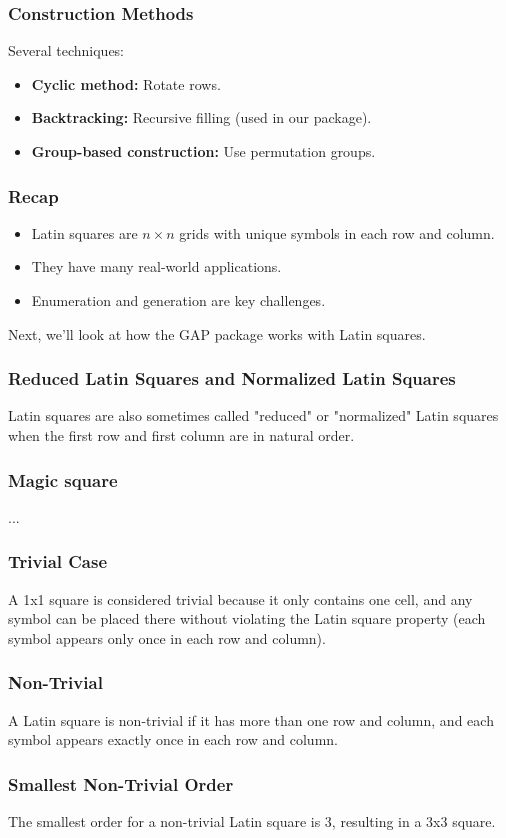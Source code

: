 \documentclass{beamer}
\begin{document}
\begin{frame}
\frametitle{Construction Methods}
Several techniques:
\begin{itemize}
  \item \textbf{Cyclic method:} Rotate rows.
  \item \textbf{Backtracking:} Recursive filling (used in our package).
  \item \textbf{Group-based construction:} Use permutation groups.
\end{itemize}
\end{frame}

\begin{frame}
\frametitle{Recap}
\begin{itemize}
  \item Latin squares are $n \times n$ grids with unique symbols in each row and column.
  \item They have many real-world applications.
  \item Enumeration and generation are key challenges.
\end{itemize}
Next, we'll look at how the GAP package works with Latin squares.
\end{frame}

\begin{frame}
\frametitle{Reduced Latin Squares and Normalized Latin Squares}
Latin squares are also sometimes called "reduced" or "normalized" Latin squares when the first row and first column are in natural order. 
\end{frame}

\begin{frame}
\frametitle{Magic square}
...
\end{frame}

\begin{frame}
\frametitle{Trivial Case}
A 1x1 square is considered trivial because it only contains one cell, and any symbol can be placed there without violating the Latin square property (each symbol appears only once in each row and column).
\end{frame}

\begin{frame}
\frametitle{Non-Trivial}
A Latin square is non-trivial if it has more than one row and column, and each symbol appears exactly once in each row and column.
\end{frame}

\begin{frame}
\frametitle{Smallest Non-Trivial Order}
The smallest order for a non-trivial Latin square is 3, resulting in a 3x3 square.
\end{frame}
\end{document}
